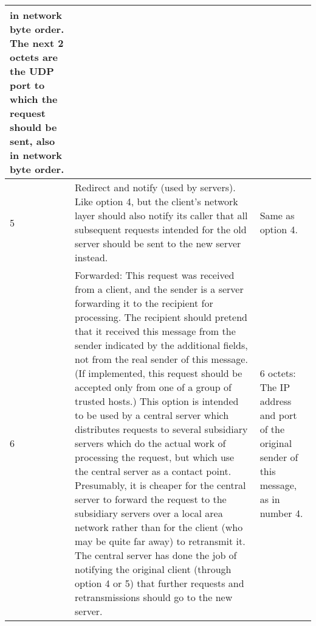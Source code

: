 \begin{center}
\begin{tabular}{|l|p{3.0in}|p{3.0in}|}
in network byte order.  The next 2 octets are the UDP port to which
the request should be sent, also in network byte order. \\ \hline
5       & Redirect and notify (used by servers).  Like option 4, but
the client's network layer should also notify its caller that all
subsequent requests intended for the old server should be sent to the
new server instead.  & Same as option 4. \\ \hline
6       & Forwarded: This request was received from a
client, and the sender is a server forwarding it to the recipient for
processing.   The recipient should pretend that it received this
message from the sender indicated by the additional fields, not from
the real sender of this message.  (If implemented, this request should be accepted only
from one of a group of trusted hosts.)   This option is intended to be
used by a central server which distributes requests to several subsidiary
servers which do the actual work of processing the request, but which
use the central server as  a contact point.  Presumably, it is cheaper
for the central server to forward the request to the subsidiary
servers over a local area network rather than for the client (who may
be quite far away) to retransmit it.    The central server has done
the job of notifying the original client (through option 4 or 5) that
further requests and retransmissions should go to the new server.
	& 6 octets: The IP address and port of the original sender of
this message, as in number 4. \\ \hline 
\end{tabular}


\end{center}
